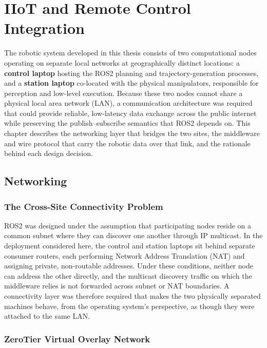 \chapter{IIoT and Remote Control Integration}
\thispagestyle{fancy}
\vspace*{0cm} %

The robotic system developed in this thesis consists of two computational nodes operating on separate local networks at geographically distinct locations: a \textbf{control laptop} hosting the ROS2 planning and trajectory-generation processes, and a \textbf{station laptop} co-located with the physical manipulators, responsible for perception and low-level execution. Because these two nodes cannot share a physical local area network (LAN), a communication architecture was required that could provide reliable, low-latency data exchange across the public internet while preserving the publish--subscribe semantics that ROS2 depends on. This chapter describes the networking layer that bridges the two sites, the middleware and wire protocol that carry the robotic data over that link, and the rationale behind each design decision.

\section{Networking}

\subsection{The Cross-Site Connectivity Problem}

ROS2 was designed under the assumption that participating nodes reside on a common subnet where they can discover one another through IP multicast. In the deployment considered here, the control and station laptops sit behind separate consumer routers, each performing Network Address Translation (NAT) and assigning private, non-routable addresses. Under these conditions, neither node can address the other directly, and the multicast discovery traffic on which the middleware relies is not forwarded across subnet or NAT boundaries. A connectivity layer was therefore required that makes the two physically separated machines behave, from the operating system's perspective, as though they were attached to the same LAN.

\subsection{ZeroTier Virtual Overlay Network}\label{sec:zerotier_overlay}

